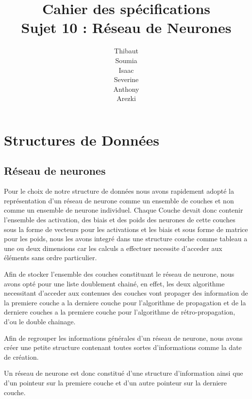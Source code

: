 \documentclass{article}
\begin{document}
\newpage
\title{Cahier des spécifications\\Sujet 10 : Réseau de Neurones}
\author{Thibaut \\Soumia {}\\Isaac {}\\Severine {}\\Anthony {}\\Arezki {}}
\maketitle

\newpage

\tableofcontents

\newpage

\section{Structures de Données}
	\subsection{Réseau de neurones}
	Pour le choix de notre structure de données nous avons rapidement adopté la représentation d'un réseau de neurone comme un ensemble de couches et non comme un ensemble de neurone individuel. Chaque Couche devait donc contenir l'ensemble des activation, des biais et des poids des neurones de cette couches sous la forme de vecteurs pour les activations et les biais et sous forme de matrice pour les poids, nous les avons integré dans une structure couche comme tableau a une ou deux dimensions car les calculs a effectuer necessite d'acceder aux éléments sans ordre particulier.
	
	Afin de stocker l'ensemble des couches constituant le réseau de neurone, nous avons opté pour une liste doublement chainé, en effet, les deux algorithme necessitant d'acceder aux contenues des couches vont propager des information de la premiere couche a la derniere couche pour l'algorithme de propagation et de la derniere couches a la premiere couche pour l'algorithme de rétro-propagation, d'ou le double chainage.
	
	Afin de regrouper les informations générales d'un réseau de neurone, nous avons créer une petite structure contenant toutes sortes d'informations comme la date de création.
	
	Un réseau de neurone est donc constitué d'une structure d'information ainsi que d'un pointeur sur la premiere couche et d'un autre pointeur sur la derniere couche.
\end{document}
